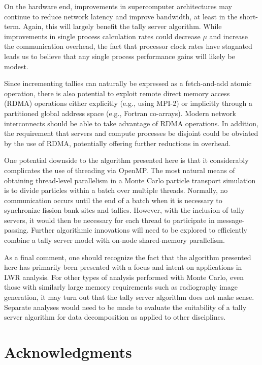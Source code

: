 \documentclass[3p,fleqn]{elsarticle}
\begin{document}
On the hardware end, improvements in supercomputer architectures may continue to
reduce network latency and improve bandwidth, at least in the short-term. Again,
this will largely benefit the tally server algorithm. While improvements in
single process calculation rates could decrease $\mu$ and increase the
communication overhead, the fact that processor clock rates have stagnated leads
us to believe that any single process performance gains will likely be modest.

Since incrementing tallies can naturally be expressed as a fetch-and-add atomic
operation, there is also potential to exploit remote direct memory access (RDMA)
operations either explicitly (e.g., using MPI-2) or implicitly through a
partitioned global address space (e.g., Fortran co-arrays). Modern network
interconnects should be able to take advantage of RDMA operations. In addition,
the requirement that servers and compute processes be disjoint could be obviated
by the use of RDMA, potentially offering further reductions in overhead.

One potential downside to the algorithm presented here is that it considerably
complicates the use of threading via OpenMP. The most natural means of obtaining
thread-level parallelism in a Monte Carlo particle transport simulation is to
divide particles within a batch over multiple threads. Normally, no
communication occurs until the end of a batch when it is necessary to
synchronize fission bank sites and tallies. However, with the inclusion of tally
servers, it would then be necessary for each thread to participate in
message-passing. Further algorithmic innovations will need to be explored to
efficiently combine a tally server model with on-node shared-memory parallelism.

As a final comment, one should recognize the fact that the algorithm presented
here has primarily been presented with a focus and intent on applications in LWR
analysis. For other types of analysis performed with Monte Carlo, even those
with similarly large memory requirements such as radiography image generation,
it may turn out that the tally server algorithm does not make sense. Separate
analyses would need to be made to evaluate the suitability of a tally server
algorithm for data decomposition as applied to other disciplines.

\section*{Acknowledgments}
\end{document}
